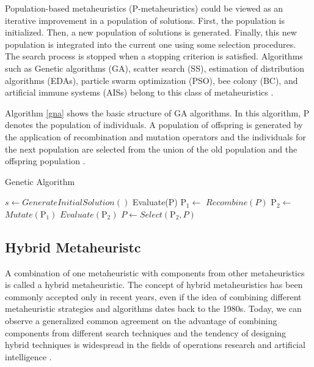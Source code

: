\documentclass[times]{stvrauth}
\begin{document}
Population-based metaheuristics (P-metaheuristics) could be viewed as an iterative improvement in a population of solutions. First, the population is initialized. Then, a new population of solutions is generated. Finally, this new population is integrated into the current one using some selection procedures. The search process is stopped when a stopping criterion is satisfied. Algorithms such as Genetic algorithms (GA), scatter search (SS), estimation of distribution algorithms (EDAs), particle swarm optimization (PSO), bee colony (BC), and artificial immune systems (AISs) belong to this class of metaheuristics \cite{talbi2009metaheuristics}. 

Algorithm \ref{gna} shows the basic structure of GA algorithms. In this algorithm, P denotes the population of individuals. A population of offspring is generated by the application of recombination and mutation operators and the individuals for the next population are selected from the union of the old population and the offspring population \cite{raidl2010metaheuristic}.


\begin{algorithm}[H]
  \caption{Genetic Algorithm}\label{gna}
  \begin{algorithmic}[3]
    
    \State $s\gets GenerateInitialSolution()$
    \State Evaluate(P)
    \State $\mbox{P}_1\gets$ $Recombine(P)$
    \State $\mbox{P}_2\gets$ $Mutate(\mbox{P}_1)$ 
    \State $Evaluate(\mbox{P}_2)$
    \State $P\gets Select(\mbox{P}_2,P)$
    \EndWhile
      
  \end{algorithmic}
\end{algorithm}

\subsection{Hybrid Metaheuristc}

A combination of one metaheuristic with components from other metaheuristics is called a hybrid metaheuristic. The concept of hybrid metaheuristics has been commonly accepted only in recent years, even if the idea of combining different metaheuristic strategies and algorithms dates back to the 1980s. Today, we can observe a generalized common agreement on the advantage of combining components from different search techniques and the tendency of designing hybrid techniques is widespread in the fields of operations research and artificial intelligence \cite{raidl2010metaheuristic}. 
\end{document}
